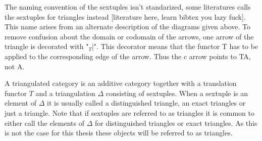 \documentclass[12pt]{article}
\theoremstyle{definition}
\theoremstyle{remark}
\begin{document}
        The naming convention of the sextuples isn't standarized, some literatures calls the sextuples for triangles instead [literature here, learn bibtex you lazy fuck]. This name arises from an alternate description of the diagrams given above. To remove confusion about the domain or codomain of the arrows, one arrow of the triangle is decorated with "$_T$|". This decorator means that the functor T has to be applied to the corresponding edge of the arrow. Thus the c arrow points to TA, not A.

        \begin{center}
        \end{center}

        A triangulated category is an additive category together with a translation functor $T$ and a triangulation $\Delta$ consisting of sextuples. When a sextuple is an element of $\Delta$ it is usually called a distinguished triangle, an exact triangles or just a triangle. Note that if sextuples are referred to as triangles it is common to either call the elements of $\Delta$ for distinguished triangles or exact triangles. As this is not the case for this thesis these objects will be referred to as triangles.
\end{document}
